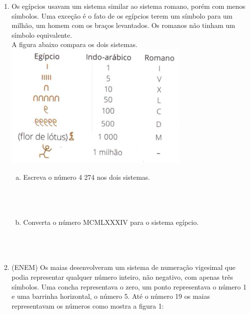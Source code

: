 \documentclass[a4paper,14pt]{article}
\begin{document}
\begin{multicols}{2}
\begin{enumerate}
\begin{enumerate}[a)]
			\end{enumerate}
			\item Os egípcios usavam um sistema similar ao sistema romano, porém com menos símbolos. Uma exceção é o fato de os egípcios terem um símbolo para um milhão, um homem com os braços levantados. Os romanos não tinham um símbolo equivalente. \\
			A figura abaixo compara os dois sistemas. \\
			\includegraphics[width=1.1\linewidth]{6FMA15_imagens/imagem1}
			\begin{enumerate}[a)]
				\item Escreva o número 4 274 nos dois sistemas. \\\\\\\\
				\item Converta o número MCMLXXXIV para o sistema egípcio. \\\\\\\\
			\end{enumerate}
			\item (ENEM) Os maias desenvolveram um sistema de numeração vigesimal que podia representar qualquer número inteiro, não negativo, com apenas três símbolos. Uma concha representava o zero, um ponto representava o número 1 e uma barrinha horizontal, o número 5. Até o número 19 os maias representavam os números como mostra a figura 1: \\

\end{enumerate}
\end{multicols}
\end{document}
